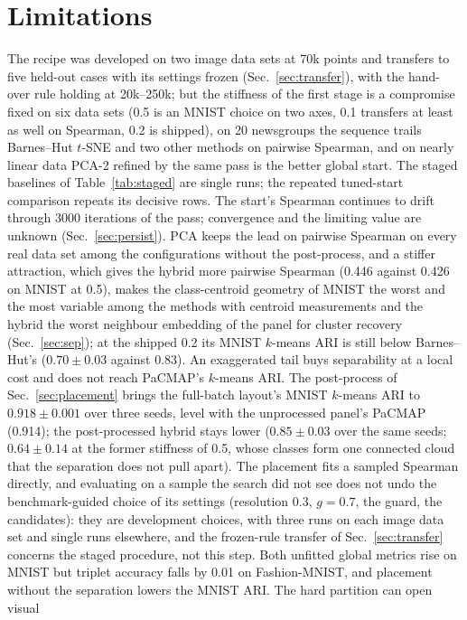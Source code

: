 \documentclass[11pt]{article}
\begin{document}
\section{Limitations}
The recipe was developed on two image data sets at 70k points and transfers to five held-out cases
with its settings frozen (Sec.~\ref{sec:transfer}), with the hand-over rule holding at 20k--250k; but
the stiffness of the first stage is a compromise fixed on six data sets (0.5 is an MNIST choice on two axes, 0.1
transfers at least as well on Spearman, 0.2 is shipped), on 20
newsgroups the sequence trails Barnes--Hut $t$-SNE and two other methods on pairwise Spearman, and on
nearly linear data PCA-2 refined by the same pass is the better global start. The staged baselines of
Table~\ref{tab:staged} are single runs; the repeated tuned-start comparison repeats its decisive rows.
The start's Spearman continues to drift through 3000 iterations of the pass; convergence and the
limiting value are unknown (Sec.~\ref{sec:persist}). PCA keeps the lead on pairwise
Spearman on every real data set among the configurations without the post-process, and a stiffer attraction, which gives the hybrid more pairwise Spearman
(0.446 against 0.426 on MNIST at 0.5),
makes the class-centroid geometry of MNIST the worst and the most variable among the methods with
centroid measurements and the hybrid
the worst neighbour embedding of the panel for cluster recovery (Sec.~\ref{sec:sep}); at the shipped 0.2 its MNIST
$k$-means ARI is still below Barnes--Hut's ($0.70 \pm 0.03$ against 0.83). An exaggerated
tail buys separability at a local cost and does not reach PaCMAP's $k$-means ARI. The post-process of
Sec.~\ref{sec:placement} brings the full-batch layout's MNIST $k$-means ARI to $0.918 \pm 0.001$ over
three seeds, level with the unprocessed panel's PaCMAP (0.914); the post-processed hybrid stays lower
($0.85 \pm 0.03$ over the same seeds; $0.64 \pm 0.14$ at the former stiffness of 0.5, whose classes form one
connected cloud that the separation does not pull apart). The placement fits a
sampled Spearman directly, and evaluating on a sample the search did not see does not undo the
benchmark-guided choice of its settings (resolution 0.3, $g = 0.7$, the guard, the candidates): they are
development choices, with three runs on each image data set and single runs elsewhere, and the frozen-rule
transfer of Sec.~\ref{sec:transfer} concerns the staged procedure, not this step. Both unfitted global
metrics rise on MNIST but triplet accuracy falls by 0.01 on Fashion-MNIST, and placement without the
separation lowers the MNIST ARI. The hard partition can open visual
\end{document}
